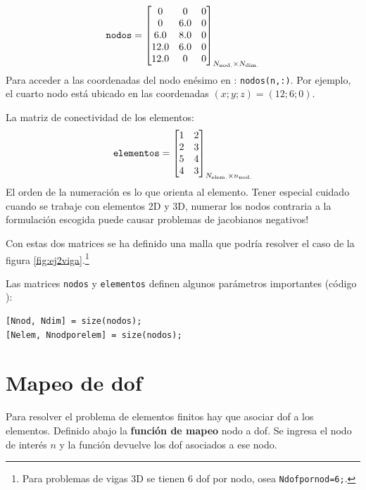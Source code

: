 \begin{equation}
	\texttt{nodos} = \begin{bmatrix}
	0 & 0 & 0 \\
	0 & 6.0 & 0 \\
	6.0 & 8.0 & 0 \\
	12.0 & 6.0 & 0 \\
	12.0 & 0 & 0
	\end{bmatrix}_{ N_{\mathrm{nod.}} \times N_{\mathrm{dim.}} }
\end{equation}
Para acceder a las coordenadas del nodo enésimo en \Matlab: \texttt{nodos(n,:)}. Por ejemplo, el cuarto nodo está ubicado en las coordenadas $(x;y;z)=(12;6;0)$.

La matriz de conectividad de los elementos:
\begin{equation} \label{eq:MatrizElementosEjemplo}
\texttt{elementos} = \begin{bmatrix}
1 & 2  \\
2 & 3  \\
5 & 4 \\
4 & 3 
\end{bmatrix}_{ N_{\mathrm{elem.}} \times n_{\mathrm{nod.}} } 
\end{equation}
El orden de la numeración es lo que orienta al elemento. Tener especial cuidado cuando se trabaje con elementos 2D y 3D, numerar los nodos contraria a la formulación escogida puede causar problemas de jacobianos negativos!

Con estas dos matrices se ha definido una malla que podría resolver el caso de la figura \ref{fig:ej2viga}.\footnote{Para problemas de vigas 3D se tienen 6 dof por nodo, osea \texttt{Ndofpornod=6;}.}

Las matrices \texttt{nodos} y \texttt{elementos} definen algunos parámetros importantes (código \Matlab):
%
\begin{lstlisting}
[Nnod, Ndim] = size(nodos);
[Nelem, Nnodporelem] = size(nodos);
\end{lstlisting}


\section{Mapeo de dof} \label{sec:dofmapping}

Para resolver el problema de elementos finitos hay que asociar dof a los elementos. Definido abajo la \textbf{función de mapeo} nodo a dof. Se ingresa el nodo de interés $n$ y la función devuelve los dof asociados a ese nodo.

